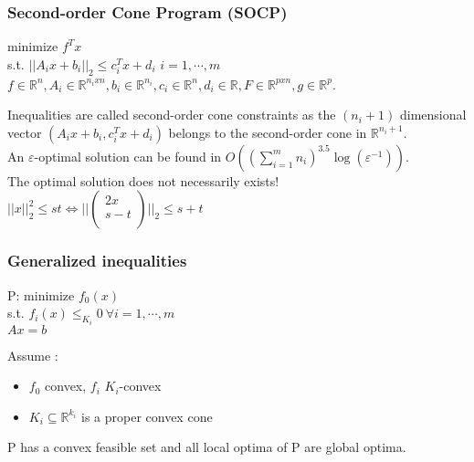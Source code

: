 \documentclass[../main.tex]{subfiles}
\begin{document}
\subsubsection{Second-order Cone Program (SOCP)}
\begin{center}
    minimize $f^Tx$\\
    s.t. $\lvert \lvert A_ix + b_i \rvert \rvert_2 \leq c_i^T x + d_i$ $i= 1,\cdots, m$\\
    $f\in \mathbb{R}^n, A_i \in \mathbb{R}^{n_ixn}, b_i \in \mathbb{R}^{n_i}, c_i \in \mathbb{R}^n, d_i \in \mathbb{R}, F \in \mathbb{R}^{pxn}, g\in \mathbb{R}^p$.
\end{center}

Inequalities are called second-order cone constraints as the $(n_i + 1)$ dimensional vector $(A_i x + b_i, c_i^T x + d_i)$ belongs to the second-order cone in $\mathbb{R}^{n_i+1}$.\\
An $\varepsilon$-optimal solution can be found in $O((\sum_{i=1}^m n_i)^{3.5} \log (\varepsilon^{-1}))$.\\

\warning The optimal solution does not necessarily exists!\\

\warning $\lvert \lvert x \rvert \rvert_2^2 \leq st \Leftrightarrow \lvert \lvert \begin{pmatrix}
    2x\\ s-t\\
\end{pmatrix} \rvert \rvert_2  \leq s+t$

\subsubsection{Generalized inequalities}
\begin{center}
    P: minimize $f_0(x)$\\
    s.t. $f_i(x) \leq_{K_i} 0 \: \forall i=1, \cdots, m$\\
    $Ax=b$
\end{center}
Assume : \begin{itemize}
    \item $f_0$ convex, $f_i$ $K_i$-convex
    \item $K_i \subseteq \mathbb{R}^{k_i}$ is a proper convex cone
\end{itemize}

P has a convex feasible set and all local optima of P are global optima.\\
\end{document}
